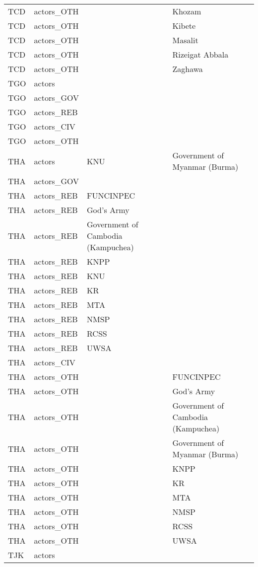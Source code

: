 \begin{table}[ht]
\begin{tabular}{llll}
  TCD & actors\_OTH &  & Khozam \\ 
  TCD & actors\_OTH &  & Kibete \\ 
  TCD & actors\_OTH &  & Masalit \\ 
  TCD & actors\_OTH &  & Rizeigat Abbala \\ 
  TCD & actors\_OTH &  & Zaghawa \\ 
  TGO & actors &  &  \\ 
  TGO & actors\_GOV &  &  \\ 
  TGO & actors\_REB &  &  \\ 
  TGO & actors\_CIV &  &  \\ 
  TGO & actors\_OTH &  &  \\ 
  THA & actors & KNU & Government of Myanmar (Burma) \\ 
  THA & actors\_GOV &  &  \\ 
  THA & actors\_REB & FUNCINPEC &  \\ 
  THA & actors\_REB & God's Army &  \\ 
  THA & actors\_REB & Government of Cambodia (Kampuchea) &  \\ 
  THA & actors\_REB & KNPP &  \\ 
  THA & actors\_REB & KNU &  \\ 
  THA & actors\_REB & KR &  \\ 
  THA & actors\_REB & MTA &  \\ 
  THA & actors\_REB & NMSP &  \\ 
  THA & actors\_REB & RCSS &  \\ 
  THA & actors\_REB & UWSA &  \\ 
  THA & actors\_CIV &  &  \\ 
  THA & actors\_OTH &  & FUNCINPEC \\ 
  THA & actors\_OTH &  & God's Army \\ 
  THA & actors\_OTH &  & Government of Cambodia (Kampuchea) \\ 
  THA & actors\_OTH &  & Government of Myanmar (Burma) \\ 
  THA & actors\_OTH &  & KNPP \\ 
  THA & actors\_OTH &  & KR \\ 
  THA & actors\_OTH &  & MTA \\ 
  THA & actors\_OTH &  & NMSP \\ 
  THA & actors\_OTH &  & RCSS \\ 
  THA & actors\_OTH &  & UWSA \\ 
  TJK & actors &  &  \\ 

\end{tabular}
\end{table}
